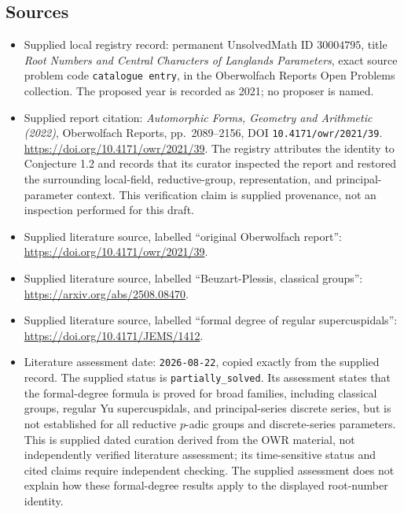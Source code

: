 \documentclass[11pt]{article}
\begin{document}
\subsection{Sources}
\begin{itemize}
\item Supplied local registry record: permanent UnsolvedMath ID \(30004795\), title \emph{Root Numbers and Central Characters of Langlands Parameters}, exact source problem code \texttt{catalogue entry}, in the Oberwolfach Reports Open Problems collection. The proposed year is recorded as 2021; no proposer is named.
\item Supplied report citation: \emph{Automorphic Forms, Geometry and Arithmetic (2022)}, Oberwolfach Reports, pp.\ 2089--2156, DOI \texttt{10.4171/owr/2021/39}. \url{https://doi.org/10.4171/owr/2021/39}. The registry attributes the identity to Conjecture 1.2 and records that its curator inspected the report and restored the surrounding local-field, reductive-group, representation, and principal-parameter context. This verification claim is supplied provenance, not an inspection performed for this draft.
\item Supplied literature source, labelled ``original Oberwolfach report'': \url{https://doi.org/10.4171/owr/2021/39}.
\item Supplied literature source, labelled ``Beuzart-Plessis, classical groups'': \url{https://arxiv.org/abs/2508.08470}.
\item Supplied literature source, labelled ``formal degree of regular supercuspidals'': \url{https://doi.org/10.4171/JEMS/1412}.
\item Literature assessment date: \texttt{2026-08-22}, copied exactly from the supplied record. The supplied status is \texttt{partially\_solved}. Its assessment states that the formal-degree formula is proved for broad families, including classical groups, regular Yu supercuspidals, and principal-series discrete series, but is not established for all reductive \(p\)-adic groups and discrete-series parameters. This is supplied dated curation derived from the OWR material, not independently verified literature assessment; its time-sensitive status and cited claims require independent checking. The supplied assessment does not explain how these formal-degree results apply to the displayed root-number identity.
\end{itemize}
\end{document}
